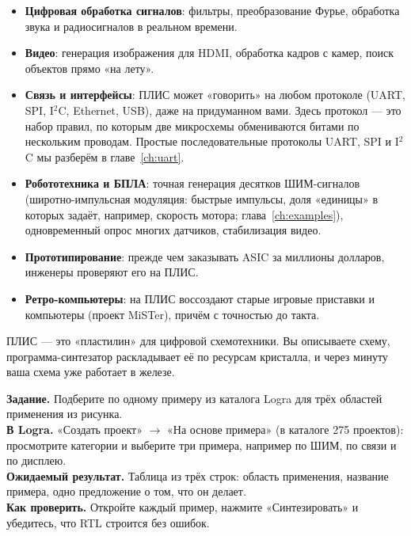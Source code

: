 \begin{itemize}
  \item \textbf{Цифровая обработка сигналов}: фильтры, преобразование
        Фурье, обработка звука и радиосигналов в реальном времени.
  \item \textbf{Видео}: генерация изображения для HDMI, обработка кадров с камер,
        поиск объектов прямо «на лету».
  \item \textbf{Связь и интерфейсы}: ПЛИС может «говорить» на любом
        протоколе (UART, SPI, I$^2$C, Ethernet, USB), даже на придуманном вами.
        Здесь протокол --- это набор правил, по которым две микросхемы
        обмениваются битами по нескольким проводам. Простые последовательные
        протоколы UART, SPI и I$^2$C мы разберём в главе~\ref{ch:uart}.
  \item \textbf{Робототехника и БПЛА}: точная генерация десятков ШИМ-сигналов (широтно-импульсная модуляция:
        быстрые импульсы, доля «единицы» в которых задаёт, например, скорость
        мотора; глава~\ref{ch:examples}),
        одновременный опрос многих датчиков, стабилизация видео.
  \item \textbf{Прототипирование}: прежде чем заказывать ASIC за
        миллионы долларов, инженеры проверяют его на ПЛИС.
  \item \textbf{Ретро-компьютеры}: на ПЛИС воссоздают старые игровые
        приставки и компьютеры (проект MiSTer), причём с точностью до такта.
\end{itemize}

\begin{ideabox}
ПЛИС --- это «пластилин» для цифровой схемотехники. Вы описываете схему,
программа-синтезатор раскладывает её по ресурсам кристалла, и через
минуту ваша схема уже работает в железе.
\end{ideabox}

\begin{diybox}
\textbf{Задание.} Подберите по одному примеру из каталога Logra для трёх областей применения из рисунка.\\
\textbf{В Logra.} «Создать проект» $\to$ «На основе примера» (в каталоге 275 проектов): просмотрите категории и выберите три примера, например по ШИМ, по связи и по дисплею.\\
\textbf{Ожидаемый результат.} Таблица из трёх строк: область применения, название примера, одно предложение о том, что он делает.\\
\textbf{Как проверить.} Откройте каждый пример, нажмите «Синтезировать» и убедитесь, что RTL строится без ошибок.
\end{diybox}

